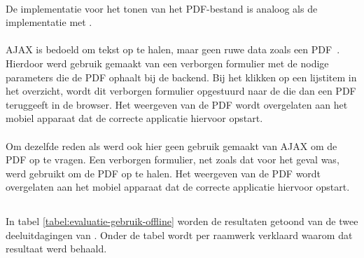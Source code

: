 \paragraph{\kendo}
De implementatie voor het tonen van het PDF-bestand is analoog als de implementatie met \jqm{}.

\paragraph{\jqm}
AJAX is bedoeld om tekst op te halen, maar geen ruwe data zoals een PDF~\cite{Scott2009}. 
Hierdoor werd gebruik gemaakt van een verborgen formulier met de nodige parameters die de PDF ophaalt bij de backend. 
Bij het klikken op een lijstitem in het overzicht, wordt dit verborgen formulier opgestuurd naar de  die dan een PDF teruggeeft in de browser. 
Het weergeven van de PDF wordt overgelaten aan het mobiel apparaat dat de correcte applicatie hiervoor opstart.

\paragraph{\lungo}
Om dezelfde reden als \jqm{} werd ook hier geen gebruik gemaakt van AJAX om de PDF op te vragen.
Een verborgen formulier, net zoals dat voor \jqm{} het geval was, werd gebruikt om de PDF op te halen.
Het weergeven van de PDF wordt overgelaten aan het mobiel apparaat dat de correcte applicatie hiervoor opstart.


\subsection{}
\label{sec:evaluatie-gebruik-offline}

In tabel \ref{tabel:evaluatie-gebruik-offline} worden de resultaten getoond van de twee deeluitdagingen van .
Onder de tabel wordt per raamwerk verklaard waarom dat resultaat werd behaald.

